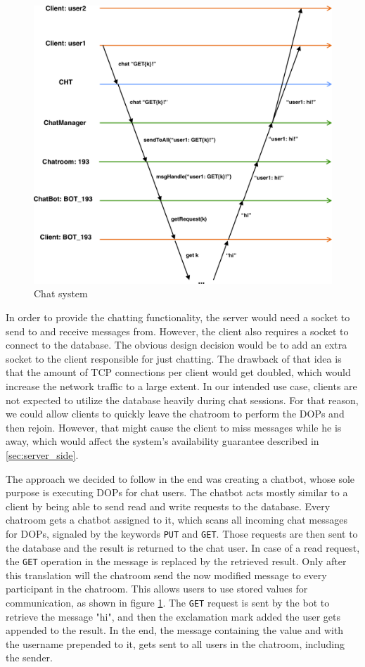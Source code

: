 \begin{figure}[h]
	\centering
	\includegraphics[width=\linewidth]{figures/chat/chat_thing.png}
	\caption{Chat system}
	\label{fig:chat_thing}
\end{figure}

In order to provide the chatting functionality, the server would need a socket to send to and receive messages from. However, the client also requires a socket to connect to the database. The obvious design decision would be to add an extra socket to the client responsible for just chatting. The drawback of that idea is that the amount of TCP connections per client would get doubled, which would increase the network traffic to a large extent. In our intended use case, clients are not expected to utilize the database heavily during chat sessions. For that reason, we could allow clients to quickly leave the chatroom to perform the DOPs and then rejoin. However, that might cause the client to miss messages while he is away, which would affect the system's availability guarantee described in \ref{sec:server_side}.

The approach we decided to follow in the end was creating a chatbot, whose sole purpose is executing DOPs for chat users. The chatbot acts mostly similar to a client by being able to send read and write requests to the database. Every chatroom gets a chatbot assigned to it, which scans all incoming chat messages for DOPs, signaled by the keywords \texttt{PUT} and \texttt{GET}. Those requests are then sent to the database and the result is returned to the chat user. In case of a read request, the \texttt{GET} operation in the message is replaced by the retrieved result. Only after this translation will the chatroom send the now modified message to every participant in the chatroom. This allows users to use stored values for communication, as shown in figure \ref{fig:chat_thing}. The \texttt{GET} request is sent by the bot to retrieve the message "hi", and then the exclamation mark added the user gets appended to the result. In the end, the message containing the value and with the username prepended to it, gets sent to all users in the chatroom, including the sender.
